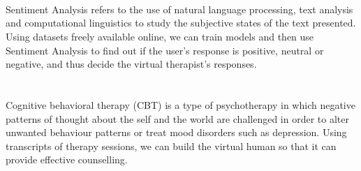 \documentclass{report}
\begin{document}
    \hspace{-4.8cm}
    \setlength{\headsep}{0pt}
    \setlength{\voffset}{-1.5inch}
    \setlength{\headheight}{0pt}
    \setlength{\topmargin}{0pt}
    \\[+2cm]
    
        \setlength{\baselineskip}{+8mm}
        
        \\[-9mm]
        	
        	\paragraph{}{\fontsize{15}{18}\selectfont Sentiment Analysis refers to the use of natural language processing, text analysis and  computational linguistics to study the subjective states of the text presented. Using datasets freely available online, we can train models and then use Sentiment Analysis to find out if the user’s response is positive, neutral or negative, and thus decide the virtual therapist’s responses.}\\[+9mm]
        
        \\[-9mm]
        	\paragraph{}{\fontsize{15}{18}\selectfont Cognitive behavioral therapy (CBT) is a type of psychotherapy in which negative patterns of thought about the self and the world are challenged in order to alter unwanted behaviour patterns or treat mood disorders such as depression. Using transcripts of therapy sessions, we can build the virtual human so that it can provide effective counselling.}
     
     \newpage
     
\end{document}
